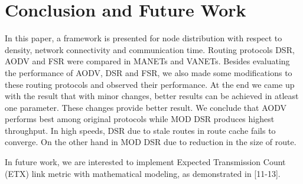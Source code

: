\documentclass[journal]{IEEEtran}
\begin{document}
\section{Conclusion and Future Work}
In this paper, a framework is presented for node distribution with respect to density, network connectivity and communication time. Routing protocols DSR, AODV and FSR were compared in MANETs and VANETs. Besides evaluating the performance of AODV, DSR and FSR, we also made some modifications to these routing protocols and observed their performance. At the end we came up with the result that with minor changes, better results can be achieved in atleast one parameter. These changes provide better result. We conclude that AODV performs best among original protocols while MOD DSR produces highest throughput. In high speeds, DSR due to stale routes in route cache fails to converge. On the other hand in MOD DSR due to reduction in the size of route.

In future work, we are interested to implement Expected Transmission Count (ETX) link metric with mathematical modeling, as demonstrated in [11-13].
\end{document}
